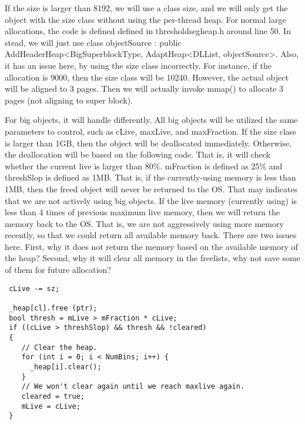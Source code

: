 If the size is larger than 8192, we will use a class size, and we will only get the object with the size class without using the per-thread heap. For normal large allocations, the code is defined defined in thresholdsegheap.h around line 50.  In stead, we will just use class objectSource : public AddHeaderHeap<BigSuperblockType, AdaptHeap<DLList, objectSource>. Also, it has an issue here, by using the size class incorrectly. For instance, if the allocation is 9000, then the size class will be 10240. However, the actual object will be aligned to 3 pages. Then we will actually invoke mmap() to allocate 3 pages (not aligning to super block).


For big objects, it will handle differently. All big objects will be utilized the same parameters to control, such as cLive, maxLive, and maxFraction. If the size class is larger than 1GB, then the object will be deallocated immediately. Otherwise, the deallocation will be based on the following code. That is, it will check whether the current live is larger than 80\%. mFraction is defined as 25\% and threshSlop is defined as 1MB. That is, if the currently-using memory is less than 1MB, then the freed object will never be returned to the OS. That may indicates that we are not actively using big objects.  If the live memory  (currently using) is less than 4 times of previous maximum live memory, then we will return the memory back to the OS. That is, we are not aggressively using more memory recently, so that we could return all available memory back. There are two issues here. First, why it does not return the memory based on the available memory of the heap? Second, why it will clear all memory in the freelists, why not save some of them for future allocation?

\begin{lstlisting}
 cLive -= sz;
       
 _heap[cl].free (ptr);
 bool thresh = mLive > mFraction * cLive;
 if ((cLive > threshSlop) && thresh && !cleared)
 {
    // Clear the heap.
    for (int i = 0; i < NumBins; i++) {
      _heap[i].clear();
    }
    // We won't clear again until we reach maxlive again.
    cleared = true;
    mLive = cLive;
 }
\end{lstlisting}



